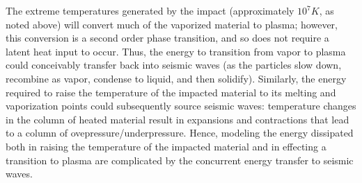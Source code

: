 \documentclass[prd,reprint,10pt]{revtex4-1}
\begin{document}
The extreme temperatures generated by the impact (approximately $10^7 K$, as noted above) will convert much of the vaporized material to plasma; however, this conversion is a second order phase transition, and so does not require a latent heat input to occur.  Thus, the energy to transition from vapor to plasma could conceivably transfer back into seismic waves (as the particles slow down, recombine as vapor, condense to liquid, and then solidify). Similarly, the energy required to raise the temperature of the impacted material to its melting and vaporization points could subsequently source seismic waves: temperature changes in the column of heated material result in expansions  and contractions that lead to a column of ovepressure/underpressure. Hence, modeling the energy dissipated both in raising the temperature of the impacted material and in effecting a transition to plasma are complicated by the concurrent energy transfer to seismic waves.
\end{document}
